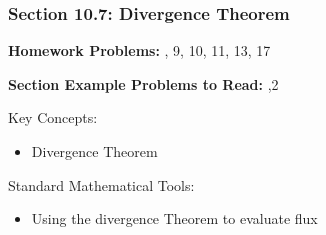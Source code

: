 %
% 

\begin{frame}
\frametitle{\Large {\color[rgb]{0.02,0.20,1.0} Section 10.7: Divergence Theorem}}
\scriptsize

\vspace{0.2cm}
{\bf Homework Problems:} \quad {}, 9, 10, 11, 13, 17

\vspace{0.2cm}

{\bf Section Example Problems to Read:} ,2

\vspace{1.2cm}

\begin{block}{Key Concepts:}
\begin{itemize}
	\item[...] Divergence Theorem
\end{itemize}
\end{block}

\begin{block}{Standard Mathematical Tools:}
\begin{itemize}
	\item[...] Using the divergence Theorem to evaluate flux
\end{itemize}
\end{block}

\end{frame}

